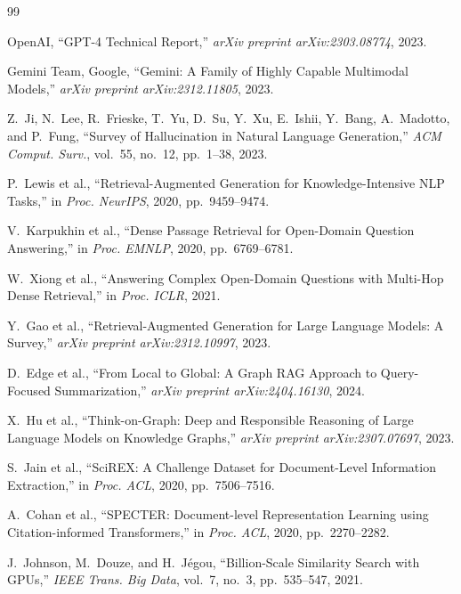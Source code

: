 \documentclass[conference]{IEEEtran}
\begin{document}
\begin{thebibliography}{99}

OpenAI, ``GPT-4 Technical Report,'' \textit{arXiv preprint arXiv:2303.08774}, 2023.

Gemini Team, Google, ``Gemini: A Family of Highly Capable Multimodal
Models,'' \textit{arXiv preprint arXiv:2312.11805}, 2023.

Z.~Ji, N.~Lee, R.~Frieske, T.~Yu, D.~Su, Y.~Xu, E.~Ishii, Y.~Bang,
A.~Madotto, and P.~Fung, ``Survey of Hallucination in Natural Language
Generation,'' \textit{ACM Comput. Surv.}, vol.~55, no.~12, pp.~1--38, 2023.

P.~Lewis et al., ``Retrieval-Augmented Generation for Knowledge-Intensive
NLP Tasks,'' in \textit{Proc. NeurIPS}, 2020, pp.~9459--9474.

V.~Karpukhin et al., ``Dense Passage Retrieval for Open-Domain Question
Answering,'' in \textit{Proc. EMNLP}, 2020, pp.~6769--6781.

W.~Xiong et al., ``Answering Complex Open-Domain Questions with
Multi-Hop Dense Retrieval,'' in \textit{Proc. ICLR}, 2021.

Y.~Gao et al., ``Retrieval-Augmented Generation for Large Language
Models: A Survey,'' \textit{arXiv preprint arXiv:2312.10997}, 2023.

D.~Edge et al., ``From Local to Global: A Graph RAG Approach to
Query-Focused Summarization,'' \textit{arXiv preprint arXiv:2404.16130}, 2024.

X.~Hu et al., ``Think-on-Graph: Deep and Responsible Reasoning of Large
Language Models on Knowledge Graphs,''
\textit{arXiv preprint arXiv:2307.07697}, 2023.

S.~Jain et al., ``SciREX: A Challenge Dataset for Document-Level
Information Extraction,'' in \textit{Proc. ACL}, 2020, pp.~7506--7516.

A.~Cohan et al., ``SPECTER: Document-level Representation Learning
using Citation-informed Transformers,'' in \textit{Proc. ACL}, 2020,
pp.~2270--2282.

J.~Johnson, M.~Douze, and H.~J{\'{e}}gou, ``Billion-Scale Similarity
Search with GPUs,'' \textit{IEEE Trans. Big Data}, vol.~7, no.~3,
pp.~535--547, 2021.


\end{thebibliography}
\end{document}
